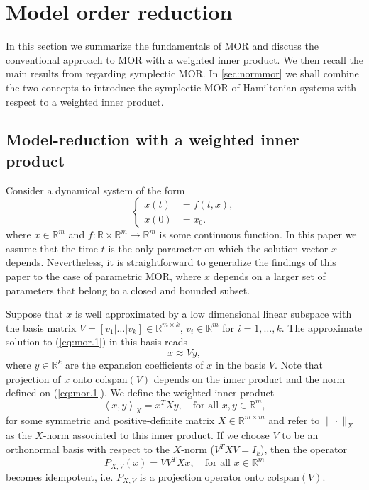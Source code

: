 \section{Model order reduction}
\label{sec:mor}

In this section we summarize the fundamentals of MOR and discuss the conventional approach to MOR with a weighted inner product. We then recall the main results from \cite{doi:10.1137/17M1111991} regarding symplectic MOR. In \cref{sec:normmor} we shall combine the two concepts to introduce the symplectic MOR of Hamiltonian systems with respect to a weighted inner product.

\subsection{Model-reduction with a weighted inner product} \label{sec:mor.1}
Consider a dynamical system of the form
\begin{equation} \label{eq:mor.1}
\left\{
\begin{aligned}
	\dot x(t) &= f(t,x), \\
	x(0) &= x_0.
\end{aligned}
\right.
\end{equation}
where $x\in \mathbb R^{m}$ and $f:\mathbb R \times \mathbb R^{m} \to \mathbb R^{m}$ is some continuous function. In this paper we assume that the time $t$ is the only parameter on which the solution vector $x$ depends. Nevertheless, it is straightforward to generalize the findings of this paper to the case of parametric MOR, where $x$ depends on a larger set of parameters that belong to a closed and bounded subset.

Suppose that $x$ is well approximated by a low dimensional linear subspace with the basis matrix $V=[v_1|\dots|v_k]\in \mathbb R^{m\times k}$, $v_i\in \mathbb R^{m}$ for $i=1,\dots,k$. The approximate solution to (\ref{eq:mor.1}) in this basis reads
\begin{equation} \label{eq:mor.2}
	x \approx Vy,
\end{equation}
where $y \in \mathbb R^k$ are the expansion coefficients of $x$ in the basis $V$. Note that projection of $x$ onto colspan$(V)$ depends on the inner product and the norm defined on (\ref{eq:mor.1}). We define the weighted inner product
\begin{equation} \label{eq:mor.3}
	\left\langle x,y \right\rangle_X = x^TXy,\quad \text{for all } x,y \in \mathbb R^m,
\end{equation}
for some symmetric and positive-definite matrix $X\in \mathbb{R}^{m\times m}$ and refer to $\|\cdot \|_X$ as the $X$-norm associated to this inner product. If we choose $V$ to be an orthonormal basis with respect to the $X$-norm ($V^TXV=I_k$), then the operator
\begin{equation} \label{eq:mor.4}
	P_{X,V}(x) = VV^TXx, \quad \text{for all } x\in \mathbb R^{m}
\end{equation}
becomes idempotent, i.e. $P_{X,V}$ is a projection operator onto colspan$(V)$.

